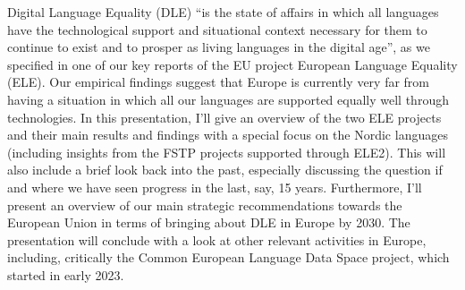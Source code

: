 Digital Language Equality (DLE) ``is the state of affairs in which all languages have the technological support and situational context necessary for them to continue to exist and to prosper as living languages in the digital age'', 
as we specified in one of our key reports of the EU project European Language Equality (ELE). 
Our empirical findings suggest that Europe is currently very far from having a situation in which all our languages are supported equally well through technologies. 
In this presentation, I'll give an overview of the two ELE projects and their main results and findings with a special focus on the Nordic languages 
(including insights from the FSTP projects supported through ELE2). This will also include a brief look back into the past, especially discussing the 
question if and where we have seen progress in the last, say, 15 years. Furthermore, I'll present an overview of our main strategic recommendations towards the European Union in terms of bringing about DLE in Europe by 2030.
The presentation will conclude with a look at other relevant activities in Europe, including, critically the Common European Language Data Space project, which started in early 2023.
